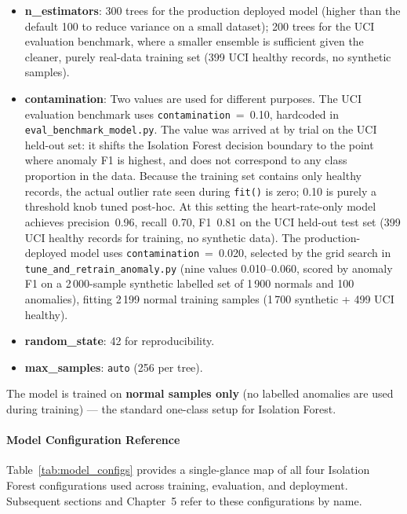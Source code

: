 \begin{itemize}
    \item \textbf{n\_estimators}: 300 trees for the production deployed model
    (higher than the default 100 to reduce variance on a small dataset);
    200 trees for the UCI evaluation benchmark, where a smaller ensemble
    is sufficient given the cleaner, purely real-data training set
    (399 UCI healthy records, no synthetic samples).
    \item \textbf{contamination}: Two values are used for different purposes.
    The UCI evaluation benchmark uses \texttt{contamination}~=~0.10, hardcoded
    in \texttt{eval\_benchmark\_model.py}. The value was arrived at by trial
    on the UCI held-out set: it shifts the Isolation Forest decision boundary
    to the point where anomaly F1 is highest, and does not correspond to any
    class proportion in the data. Because the training set contains only
    healthy records, the actual outlier rate seen during \texttt{fit()} is
    zero; 0.10 is purely a threshold knob tuned post-hoc.
    At this setting the heart-rate-only model achieves
    precision~0.96, recall~0.70, F1~0.81 on the UCI held-out test set
    (399 UCI healthy records for training, no synthetic data).
    The production-deployed model uses \texttt{contamination}~=~0.020, selected
    by the grid search in \texttt{tune\_and\_retrain\_anomaly.py} (nine values
    0.010--0.060, scored by anomaly F1 on a 2\,000-sample synthetic labelled set
    of 1\,900 normals and 100 anomalies), fitting 2\,199 normal training samples
    (1\,700 synthetic + 499 UCI healthy).
    \item \textbf{random\_state}: 42 for reproducibility.
    \item \textbf{max\_samples}: \texttt{auto} (256 per tree).
\end{itemize}

The model is trained on \textbf{normal samples only} (no labelled
anomalies are used during training) — the standard one-class setup for
Isolation Forest.

\paragraph{Model Configuration Reference}

Table~\ref{tab:model_configs} provides a single-glance map of all four Isolation
Forest configurations used across training, evaluation, and deployment.
Subsequent sections and Chapter~5 refer to these configurations by name.


